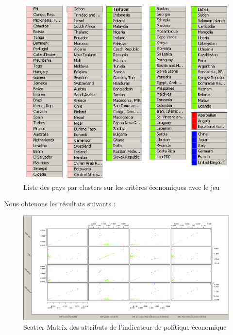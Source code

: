 \begin{figure}[H]
	\begin{center}
		\includegraphics[scale=0.5]{Image/TableViewPolitiqueNoMissing2}
		\caption{Liste des pays par clusters sur les critères économiques avec le jeu \jeuc}
	\end{center}
\end{figure}


Nous obtenons les résultats suivants : 

\begin{figure}[H]
	\begin{center}
		\includegraphics[scale=0.5]{Image/ScatterMatrixPolitiqueNoMissing2}
		\caption{Scatter Matrix des attributs de l'indicateur de politique économique \jeuc}
	\end{center}
\end{figure}

